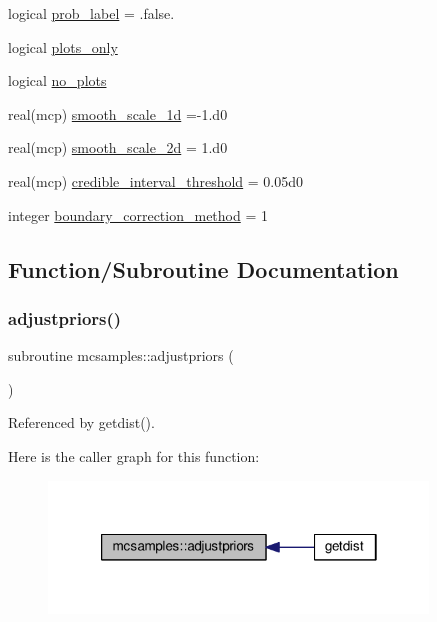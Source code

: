 \begin{DoxyCompactItemize}
$$logical \mbox{\hyperlink{namespacemcsamples_ad626a7a57271fbc966f7d06ed74f68af}{prob\+\_\+label}} = .false.
\item 
logical \mbox{\hyperlink{namespacemcsamples_ad6a6de60cc3e044646e884be9bdc3b67}{plots\+\_\+only}}
\item 
logical \mbox{\hyperlink{namespacemcsamples_a38fc836d9b47b5b811c875938d43d2c9}{no\+\_\+plots}}
\item 
real(mcp) \mbox{\hyperlink{namespacemcsamples_aa4a60a69265c0e88d0f93113ca84e3bf}{smooth\+\_\+scale\+\_\+1d}} =-\/1.d0
\item 
real(mcp) \mbox{\hyperlink{namespacemcsamples_a303a66c9ef1a6bf38167952d63caf780}{smooth\+\_\+scale\+\_\+2d}} = 1.d0
\item 
real(mcp) \mbox{\hyperlink{namespacemcsamples_ae1862ffcd750637a6e92a95ec020c591}{credible\+\_\+interval\+\_\+threshold}} = 0.\+05d0
\item 
integer \mbox{\hyperlink{namespacemcsamples_a72368716a8ad215156d18cf044952cdc}{boundary\+\_\+correction\+\_\+method}} = 1
\end{DoxyCompactItemize}


\subsection{Function/\+Subroutine Documentation}
\mbox{\label{namespacemcsamples_aa4af8bb5067761fcc26783a3198edb1a}} 
\subsubsection{\texorpdfstring{adjustpriors()}{adjustpriors()}}
{\footnotesize\ttfamily subroutine mcsamples\+::adjustpriors (\begin{DoxyParamCaption}{ }\end{DoxyParamCaption})}



Referenced by getdist().

Here is the caller graph for this function\+:
\nopagebreak
\begin{figure}[H]
\begin{center}
\leavevmode
\includegraphics[width=286pt]{namespacemcsamples_aa4af8bb5067761fcc26783a3198edb1a_icgraph}
\end{center}
\end{figure}
\mbox{\label{namespacemcsamples_ad44656764a16d6b3b6acbbab57653252}} 

